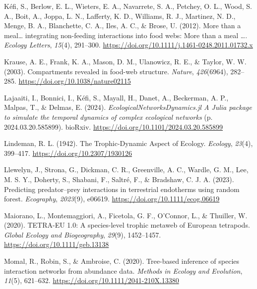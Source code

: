 \documentclass[
]{article}
\newlength{\cslhangindent}
\newenvironment{CSLReferences}[2] %
 {\begin{list}{}{%
  \setlength{\itemindent}{0pt}
  \setlength{\leftmargin}{0pt}
  \setlength{\parsep}{0pt}
  \ifodd #1
   \setlength{\leftmargin}{\cslhangindent}
   \setlength{\itemindent}{-1\cslhangindent}
  \fi
  \setlength{\itemsep}{#2\baselineskip}}}
 {\end{list}}
\begin{document}
\begin{CSLReferences}{1}{0}
Kéfi, S., Berlow, E. L., Wieters, E. A., Navarrete, S. A., Petchey, O.
L., Wood, S. A., Boit, A., Joppa, L. N., Lafferty, K. D., Williams, R.
J., Martinez, N. D., Menge, B. A., Blanchette, C. A., Iles, A. C., \&
Brose, U. (2012). More than a meal{\ldots{}} integrating non-feeding
interactions into food webs: {More} than a meal {\ldots{}}.
\emph{Ecology Letters}, \emph{15}(4), 291--300.
\url{https://doi.org/10.1111/j.1461-0248.2011.01732.x}

Krause, A. E., Frank, K. A., Mason, D. M., Ulanowicz, R. E., \& Taylor,
W. W. (2003). Compartments revealed in food-web structure.
\emph{Nature}, \emph{426}(6964), 282--285.
\url{https://doi.org/10.1038/nature02115}

Lajaaiti, I., Bonnici, I., Kéfi, S., Mayall, H., Danet, A., Beckerman,
A. P., Malpas, T., \& Delmas, E. (2024).
\emph{{EcologicalNetworksDynamics}.jl {A Julia} package to simulate the
temporal dynamics of complex ecological networks} (p.
2024.03.20.585899). bioRxiv.
\url{https://doi.org/10.1101/2024.03.20.585899}

Lindeman, R. L. (1942). The {Trophic-Dynamic Aspect} of {Ecology}.
\emph{Ecology}, \emph{23}(4), 399--417.
\url{https://doi.org/10.2307/1930126}

Llewelyn, J., Strona, G., Dickman, C. R., Greenville, A. C., Wardle, G.
M., Lee, M. S. Y., Doherty, S., Shabani, F., Saltré, F., \& Bradshaw, C.
J. A. (2023). Predicting predator--prey interactions in terrestrial
endotherms using random forest. \emph{Ecography}, \emph{2023}(9),
e06619. \url{https://doi.org/10.1111/ecog.06619}

Maiorano, L., Montemaggiori, A., Ficetola, G. F., O'Connor, L., \&
Thuiller, W. (2020). {TETRA-EU} 1.0: {A} species-level trophic metaweb
of {European} tetrapods. \emph{Global Ecology and Biogeography},
\emph{29}(9), 1452--1457. \url{https://doi.org/10.1111/geb.13138}

Momal, R., Robin, S., \& Ambroise, C. (2020). Tree-based inference of
species interaction networks from abundance data. \emph{Methods in
Ecology and Evolution}, \emph{11}(5), 621--632.
\url{https://doi.org/10.1111/2041-210X.13380}


\end{CSLReferences}
\end{document}
